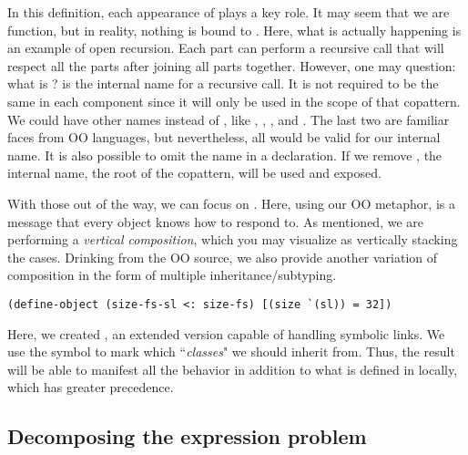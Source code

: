 In this definition, each appearance of  plays a key role. It may seem that we are  function, but in reality, nothing is bound to .
Here, what is actually happening is an example of open recursion.
Each part can perform a recursive call that will respect all the parts after joining all parts together.
However, one may question: what is ?
 is the internal name for a recursive call.
It is not required to be the same in each component since it will only be used in the scope of that copattern.
We could have other names instead of , like , , , and .
The last two are familiar faces from OO languages, but nevertheless, all would be valid for our internal name.
It is also possible to omit the name in a  declaration.
If we remove , the internal name, the root of the copattern, will be used and exposed. 

With those out of the way, we can focus on . Here, using our OO metaphor,  is a message that every object knows how to respond to. As mentioned, we are performing a \emph{vertical composition}, which you may visualize as vertically stacking the cases.
Drinking from the OO source, we also provide another variation of composition in the form of multiple inheritance/subtyping.
\begin{verbatim}
(define-object (size-fs-sl <: size-fs) [(size `(sl)) = 32])
\end{verbatim}
Here, we created , an extended version capable of handling symbolic links.
We use the \scm{<:} symbol to mark which ``\emph{classes}" we should inherit from.
Thus, the result will be able to manifest all the  behavior in addition to what is defined in  locally, which has greater precedence.

  
\subsection{Decomposing the expression problem}

